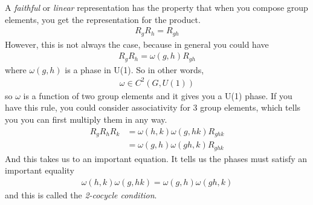 A \emph{faithful} or \emph{linear} representation has the property that when you
compose group elements,
you get the representation for the product.
\begin{align}
    R_g R_h = R_{gh}
\end{align}
However, this is not always the case,
because in general you could have
\begin{align}
    R_g R_h = \omega(g, h) R_{gh}
\end{align}
where $\omega(g,h)$ is a phase in U(1).
So in other words,
\begin{align}
    \omega \in C^2(G, U(1))
\end{align}
so $\omega$ is a function of two group elements and it gives you a U(1) phase.
If you have this rule,
you could consider associativity for 3 group elements,
which tells you you can first multiply them in any way.
\begin{align}
    R_g R_h R_k &=
    \omega(h, k) \omega(g, hk) R_{ghk}\\
    &= \omega(g, h)\omega(gh, k) R_{ghk}
\end{align}
And this takes us to an important equation.
It tells us the phases must satisfy an important equality
\begin{align}
    \omega(h, k) \omega(g, hk)
    =
    \omega(g, h) \omega(gh, k)
\end{align}
and this is called the \emph{2-cocycle condition}.

